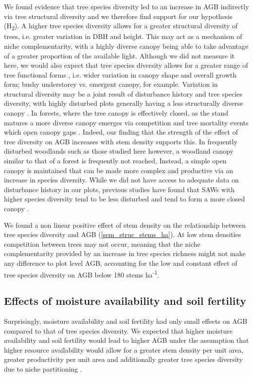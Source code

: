 \documentclass[11pt,a4paper]{article}
\newcommand{\textapprox}{\raisebox{0.5ex}{\texttildelow}}  %
\begin{document}
We found evidence that tree species diversity led to an increase in AGB indirectly via tree structural diversity and we therefore find support for our hypothesis (H\textsubscript{2}). A higher tree species diversity allows for a greater structural diversity of trees, i.e. greater variation in DBH and height. This may act as a mechanism of niche complementarity, with a highly diverse canopy being able to take advantage of a greater proportion of the available light. Although we did not measure it here, we would also expect that tree species diversity allows for a greater range of tree functional forms \citep{}, i.e. wider variation in canopy shape and overall growth form; bushy understorey vs. emergent canopy, for example. Variation in structural diversity may be a joint result of disturbance history and tree species diversity, with highly disturbed plots generally having a less structurally diverse canopy \citep{LaRue2019}. In forests, where the tree canopy is effectively closed, as the stand matures a more diverse canopy emerges via competition and tree mortality events which open canopy gaps \citep{Muscolo2014}. Indeed, our finding that the strength of the effect of tree diversity on AGB increases with stem density supports this. In frequently disturbed woodlands such as those studied here however, a woodland canopy similar to that of a forest is frequently not reached, Instead, a simple open canopy is maintained that can be made more complex and productive via an increase in species diversity. While we did not have access to adequate data on disturbance history in our plots, previous studies have found that SAWs with higher species diversity tend to be less disturbed and tend to form a more closed canopy \citep{Chidumayo2013, Mutowo2012}.

We found a non linear positive effect of stem density on the relationship between tree species diversity and AGB (\autoref{sem_struc_stems_ha}). At low stem densities competition between trees may not occur, meaning that the niche complementarity provided by an increase in tree species richness might not make any difference to plot level AGB, accounting for the low and constant effect of tree species diversity on AGB below \textapprox{}180 stems ha\textsuperscript{-1}.

\subsection{Effects of moisture availability and soil fertility}

Surprisingly, moisture availability and soil fertility had only small effects on AGB compared to that of tree species diversity. We expected that higher moisture availability and soil fertility would lead to higher AGB under the assumption that higher resource availability would allow for a greater stem density per unit area, greater productivity per unit area and additionally greater tree species diversity due to niche partitioning \citep{Kraaij2006, Shirima2015}.
\end{document}
